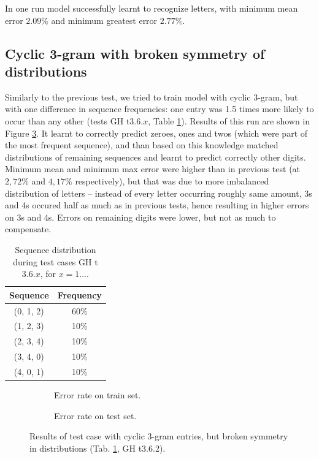 \documentclass[declaration,shortabstract,lic,english]{iithesis}
\begin{document}
In one run model successfully learnt to recognize letters, with minimum mean error $2.09\%$ and minimum greatest error $2.77\%$.

\subsection{Cyclic 3-gram with broken symmetry of distributions}

Similarly to the previous test, we tried to train model with cyclic 3-gram, but with one difference in sequence frequencies: one entry was 1.5 times more likely to occur than any other (tests GH t$3.6.x$, Table \ref{tab:cyclic_test_no_symmetry}). Results of this run are shown in Figure \ref{fig:t362_results}. It learnt to correctly predict zeroes, ones and twos (which were part of the most frequent sequence), and than based on this knowledge matched distributions of remaining sequences and learnt to predict correctly other digits. Minimum mean and minimum max error were higher than in previous test (at $2,72\%$ and $4,17\%$ respectively), but that was due to more imbalanced distribution of letters -- instead of every letter occurring roughly same amount, 3s and 4s occured half as much as in previous tests, hence resulting in higher errors on 3s and 4s. Errors on remaining digits were lower, but not as much to compensate.

\begin{table}[htbp]
\centering
\begin{tabular}{c|c}
    Sequence & Frequency \\
    \hline
    (0, 1, 2) & 60\% \\
    (1, 2, 3) & 10\% \\
    (2, 3, 4) & 10\% \\
    (3, 4, 0) & 10\% \\
    (4, 0, 1) & 10\% \\
\end{tabular}
\caption{Sequence distribution during test cases GH t$3.6.x$, for $x=1\dots$.}
\label{tab:cyclic_test_no_symmetry}
\end{table}

\begin{figure}[ht]
\begin{subfigure}[b]{.49\textwidth}
    \def\svgwidth{\textwidth}
    
    \caption{Error rate on train set.}
    \label{fig:t362_train_error}
\end{subfigure}
\begin{subfigure}[b]{.49\textwidth}
    \def\svgwidth{\textwidth}
    
    \caption{Error rate on test set.}
    \label{fig:t362_test_error}
\end{subfigure}
\caption{Results of test case with cyclic 3-gram entries, but broken symmetry in distributions (Tab. \ref{tab:cyclic_test_no_symmetry}, GH t3.6.2).}
\label{fig:t362_results}
\end{figure}
\end{document}
